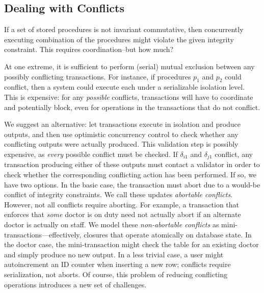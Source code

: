 \subsection{Dealing with Conflicts}


If a set of stored procedures is not invariant commutative, then
concurrently executing combination of the procedures might violate the
given integrity constraint. This requires coordination--but how much?

At one extreme, it is sufficient to perform (serial) mutual exclusion
between any possibly conflicting transactions. For instance, if
procedures $p_1$ and $p_2$ could conflict, then a system could execute
each under a serializable isolation level. This is expensive: for any
\textit{possible} conflicts, transactions will have to coordinate and
potentially block, even for operations in the transactions that do not
conflict.

We suggest an alternative: let transactions execute in isolation and
produce outputs, and then use optimistic concurrency control to check
whether any conflicting outputs were actually produced. This
validation step is possibly expensive, as \textit{every} possible
conflict must be checked. If $\delta_{i1}$ and $\delta_{j1}$ conflict,
any transaction producing either of these outputs must contact a
validator in order to check whether the corresponding conflicting
action has been performed. If so, we have two options. In the basic
case, the transaction must abort due to a would-be conflict of
integrity constraints. We call these updates \textit{abortable
  conflicts}. However, not all conflicts require aborting. For
example, a transaction that enforces that \textit{some} doctor is on
duty need not actually abort if an alternate doctor is actually on
staff. We model these \textit{non-abortable conflicts} as
mini-transactions---effectively, closures that operate atomically on
database state. In the doctor case, the mini-transaction might check
the table for an existing doctor and simply produce no new output. In
a less trivial case, a user might autoincrement an ID counter when
inserting a new row; conflicts require serialization, not aborts. Of
course, this problem of reducing conflicting operations introduces a
new set of challenges.

